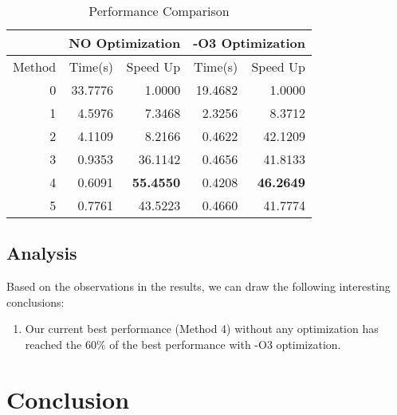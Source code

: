 \documentclass[12pt]{article}
\begin{document}
\begin{table}[h!]
	\small
	\begin{center}
	\caption{\label{tab:performance} Performance Comparison}
	\begin{tabular}{|r|r|r|r|r|}
		\hline
		 & \multicolumn{2}{c|}{NO Optimization} & \multicolumn{2}{c|}{-O3 Optimization} \\ \hline
		Method & Time(s) & Speed Up & Time(s) & Speed Up \\ \hline
		0  &  33.7776	& 1.0000		&19.4682		&	1.0000 \\ \hline
		1  &		4.5976		&	7.3468		& 2.3256		&	8.3712 \\ \hline
		2  &		4.1109  & 8.2166		&	0.4622		&	42.1209 \\ \hline
		3  &		0.9353  & 36.1142	&	0.4656		&	41.8133 \\ \hline
		4  &		0.6091  & \textbf{55.4550}	& 0.4208		&	\textbf {46.2649} \\ \hline
		5  &		0.7761  & 43.5223	&	0.4660		&	41.7774 \\ \hline
	\end{tabular}
	\end{center}
\end{table}

\subsection{Analysis}
Based on the observations in the results, we can draw the following interesting 
conclusions:
\begin{enumerate}
\item Our current best performance (Method 4) without any optimization has reached 
the 60\% of the best performance with -O3 optimization.
\end{enumerate}

\section{Conclusion}
\end{document}
